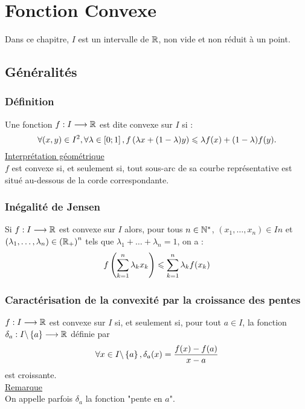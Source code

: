 \chapter{Fonction Convexe}

\minitoc

Dans ce chapitre, \(I\) est un intervalle de \(\mathbb{R}\), non vide et non réduit à un point.

\section{Généralités}
\subsection{Définition}
\begin{defi}
    Une fonction \(f : I \longrightarrow \mathbb{R}\) est dite convexe sur \(I\) si :
    \[\forall (x, y) \in I^2, \forall \lambda  \in \left[0;1\right] , f \left(\lambda x + (1 - \lambda )y\right) \leqslant \lambda f (x) + (1 - \lambda )f (y).\]
    \underline{Interprétation géométrique}\\
    \(f\) est convexe si, et seulement si, tout sous-arc de sa courbe représentative est situé au-dessous de la corde correspondante.
\end{defi}

\subsection{Inégalité de Jensen}
\begin{defprop}
    Si \(f : I \longrightarrow \mathbb{R}\) est convexe sur \(I\) alors, pour tous \(n \in \mathbb{N}^*\), \((x_1, \dots , x_n) \in In\) et \((\lambda_1, \dots , \lambda_n) \in \left(\mathbb{R}_+\right)^n\) tels que \(\lambda_1 + \dots + \lambda_n = 1\), on a :
    \[f\left(\sum^n_{k=1}\lambda_kx_k\right) \leqslant \sum^n_{k=1}\lambda_k f(x_k)\]
\end{defprop}

\subsection{Caractérisation de la convexité par la croissance des pentes}
\begin{defprop}
    \(f : I \longrightarrow \mathbb{R}\) est convexe sur \(I\) si, et seulement si, pour tout \(a \in I\), la fonction \(\delta_a : I \backslash \left\lbrace a\right\rbrace \longrightarrow \mathbb{R}\) définie par
    \[\forall x \in I \backslash \left\lbrace a\right\rbrace, \delta_a(x) = \frac{f (x) - f (a)}{x - a}\]
    est croissante.\\
    \underline{Remarque} \\
    On appelle parfois \(\delta_a\) la fonction "pente en \(a\)".
\end{defprop}

